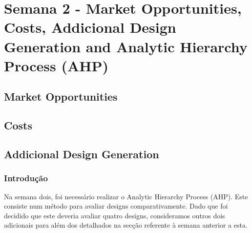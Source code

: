 \section{Semana 2 - Market Opportunities, Costs, Addicional Design Generation and Analytic Hierarchy Process (AHP)}
\subsection{Market Opportunities}
\subsection{Costs}
\subsection{Addicional Design Generation}
\subsubsection{Introdução}
Na semana dois, foi necessário realizar o Analytic Hierarchy Process (AHP). Este consiste num método para avaliar designs comparativamente. Dado que foi decidido que este deveria avaliar quatro designs, consideramos outros dois adicionais para além dos detalhados na secção referente à semana anterior a esta.\par

